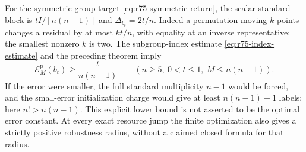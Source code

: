 For the symmetric-group target \eqref{eq:r75-symmetric-return}, the
scalar standard block is $tI/[n(n-1)]$ and $\Delta_{b_t}=2t/n$.
Indeed a permutation moving $k$ points changes a residual by at most
$kt/n$, with equality at an inverse representative; the smallest
nonzero $k$ is two. The subgroup-index estimate
\eqref{eq:r75-index-estimate} and the preceding theorem imply
\begin{equation}\label{eq:r76-symmetric-robust-lower}
 \mathcal E_M^{\mathrm p}(b_t)\ge\frac{t}{n(n-1)}
       \qquad(n\ge5,\ 0<t\le1,\ M\le n(n-1)).
\end{equation}
If the error were smaller, the full standard multiplicity $n-1$
would be forced, and the small-error initialization charge would give
at least $n(n-1)+1$ labels; here $n!>n(n-1)$.
This explicit lower bound is not asserted to be the optimal error
constant. At every exact resource jump the finite optimization also
gives a strictly positive robustness radius, without a claimed closed
formula for that radius.

